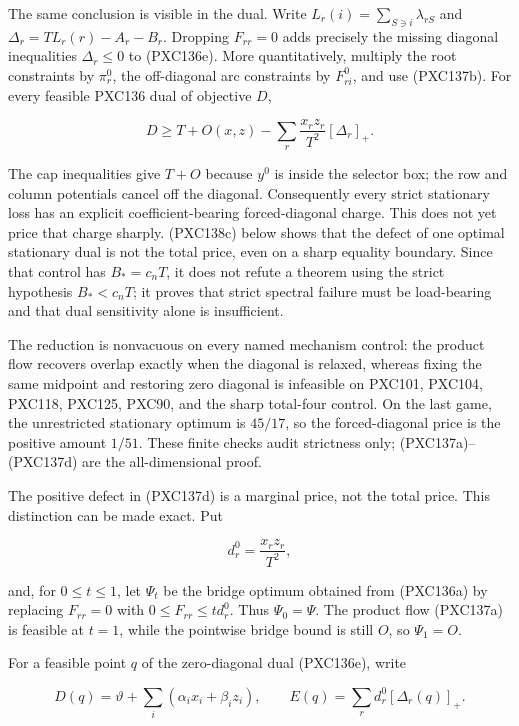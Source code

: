 \documentclass[11pt]{article}
\begin{document}
The same conclusion is visible in the dual.  Write
\(L_r(i)=\sum_{S\ni i}\lambda_{rS}\) and
\(\Delta_r=T L_r(r)-A_r-B_r\).  Dropping \(F_{rr}=0\) adds precisely the
missing diagonal inequalities \(\Delta_r\le0\) to (PXC136e).  More
quantitatively, multiply the root constraints by \(\pi_r^0\), the
off-diagonal arc constraints by \(F^0_{ri}\), and use (PXC137b).  For every
feasible PXC136 dual of objective \(D\),

\begin{equation}
 D\ge T+O(x,z)-\sum_r\frac{x_rz_r}{T^2}[\Delta_r]_+ .   \tag{PXC137d}
\end{equation}

The cap inequalities give \(T+O\) because \(y^0\) is inside the selector
box; the row and column potentials cancel off the diagonal.  Consequently
every strict stationary loss has an explicit coefficient-bearing
forced-diagonal charge.  This does not yet price that charge sharply.
(PXC138c) below shows that the defect of one optimal stationary dual is not
the total price, even on a sharp equality boundary.  Since that control has
\(B_*=c_nT\), it does not refute a theorem using the strict hypothesis
\(B_*<c_nT\); it proves that strict spectral failure must be load-bearing
and that dual sensitivity alone is insufficient.

The reduction is nonvacuous on every named mechanism control: the product
flow recovers overlap exactly when the diagonal is relaxed, whereas fixing
the same midpoint and restoring zero diagonal is infeasible on PXC101,
PXC104, PXC118, PXC125, PXC90, and the sharp total-four control.  On the
last game, the unrestricted stationary optimum is \(45/17\), so the
forced-diagonal price is the positive amount \(1/51\).  These finite checks
audit strictness only; (PXC137a)--(PXC137d) are the all-dimensional proof.

The positive defect in (PXC137d) is a marginal price, not the total price.
This distinction can be made exact.  Put

\[
 d_r^0=\frac{x_rz_r}{T^2},
\]

and, for \(0\le t\le1\), let \(\Psi_t\) be the bridge optimum obtained from
(PXC136a) by replacing \(F_{rr}=0\) with
\(0\le F_{rr}\le t d_r^0\).  Thus \(\Psi_0=\Psi\).  The product flow
(PXC137a) is feasible at \(t=1\), while the pointwise bridge bound is still
\(O\), so \(\Psi_1=O\).

For a feasible point \(q\) of the zero-diagonal dual (PXC136e), write

\[
 D(q)=\vartheta+\sum_i(\alpha_ix_i+\beta_iz_i),\qquad
 E(q)=\sum_r d_r^0[\Delta_r(q)]_+.
\]
\end{document}
